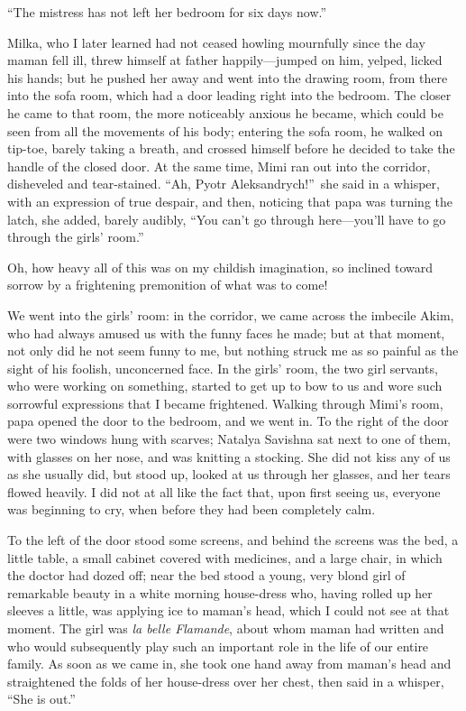 ``The mistress has not left her bedroom for six days now.'' %

Milka, who I later learned had not ceased howling mournfully since the day maman fell ill, threw himself at father happily---jumped on him, yelped, licked his hands; but he pushed her away and went into the drawing room, from there into the sofa room, which had a door leading right into the bedroom. The closer he came to that room, the more noticeably anxious he became, which could be seen from all the movements of his body; entering the sofa room, he walked on tip-toe, barely taking a breath, and crossed himself before he decided to take the handle of the closed door. At the same time, Mimi ran out into the corridor, disheveled and tear-stained. ``Ah, Pyotr Aleksandrych!''~she said in a whisper, with an expression of true despair, and then, noticing that papa was turning the latch, she added, barely audibly, ``You can't go through here---you'll have to go through the girls' room.'' %

Oh, how heavy all of this was on my childish imagination, so inclined toward sorrow by a frightening premonition of what was to come!

We went into the girls' room: in the corridor, we came across the imbecile Akim, who had always amused us with the funny faces he made; but at that moment, not only did he not seem funny to me, but nothing struck me as so painful as the sight of his foolish, unconcerned face. In the girls' room, the two girl servants, who were working on something, started to get up to bow to us and wore such sorrowful expressions that I became frightened. Walking through Mimi's room, papa opened the door to the bedroom, and we went in. To the right of the door were two windows hung with scarves; Natalya Savishna sat next to one of them, with glasses on her nose, and was knitting a stocking. She did not kiss any of us as she usually did, but stood up, looked at us through her glasses, and her tears flowed heavily. I did not at all like the fact that, upon first seeing us, everyone was beginning to cry, when before they had been completely calm.

To the left of the door stood some screens, and behind the screens was the bed, a little table, a small cabinet covered with medicines, and a large chair, in which the doctor had dozed off; near the bed stood a young, very blond girl of remarkable beauty in a white morning house-dress who, having rolled up her sleeves a little, was applying ice to maman's head, which I could not see at that moment. The girl was \textit{la belle Flamande}, about whom maman had written and who would subsequently play such an important role in the life of our entire family. As soon as we came in, she took one hand away from maman's head and straightened the folds of her house-dress over her chest, then said in a whisper, ``She is out.'' %


